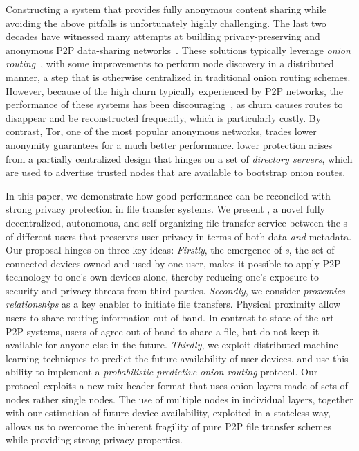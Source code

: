 Constructing a system that provides fully anonymous content sharing while avoiding the above pitfalls is unfortunately highly
challenging. The last two decades have witnessed many attempts at building privacy-preserving and anonymous P2P data-sharing
networks~\cite{Clarke:2001,Gnunet2002,Freedman:2002,Nambiar:2006,Rennhard:2002}.
These solutions typically leverage \emph{onion
 routing}~\cite{Chaum:1981}, with some improvements to perform node
 discovery in a distributed manner, a step that is otherwise
centralized in traditional onion routing schemes. However, because of the high
churn typically experienced by P2P networks, the performance of these systems has been
discouraging~\cite{LeBlond:2013}, as churn causes routes to disappear and be
reconstructed frequently, which is particularly costly. By contrast, \ac{Tor}, 
one of the most popular anonymous networks,
trades lower anonymity guarantees for a much better
performance.   lower protection arises from
a partially centralized design that hinges on a set of \emph{directory
servers}, which are used to advertise trusted nodes that are available to bootstrap onion
routes. 

In this paper, we demonstrate how good performance can be reconciled
with strong privacy protection in file transfer systems. We present
\name{}, a novel fully decentralized, autonomous,
and self-organizing file transfer service between the \squad{}s of different users that preserves user privacy
in terms of both data \emph{and} metadata.  Our proposal hinges on three
key ideas: \emph{Firstly}, the emergence of \emph{\squad{}s}, the set of connected devices owned and used by one user, 
makes it possible to apply P2P technology to one's own devices
alone, thereby reducing one's exposure to security and privacy threats
from third parties. \emph{Secondly}, we consider \emph{proxemics relationships} as a key enabler to initiate file
transfers. Physical proximity allow users to share
routing information out-of-band.
In contrast to state-of-the-art P2P systems, users of \name agree out-of-band to share a file, but
do not keep it available for anyone else in the future. \emph{Thirdly}, we
exploit distributed machine learning techniques to predict the future
availability of user devices, and use this ability to implement a
\emph{probabilistic predictive onion routing} protocol. Our protocol exploits a new mix-header format that uses onion layers made of sets of nodes rather single nodes. The use of multiple nodes in individual layers, together with our estimation of future device availability, exploited in a stateless way, allows
us to overcome the inherent fragility of pure P2P file transfer schemes while providing strong privacy properties. 

